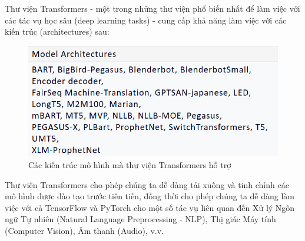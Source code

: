 Thư viện Transformers - một trong những thư viện phổ biến nhất để làm việc với các tác vụ học sâu (deep learning tasks) - cung cấp khả năng làm việc với các kiến trúc (architectures) sau:\\

\begin{figure}[htp]
    \centering
    \includegraphics{images/kdl2.png}
    \caption{Các kiến trúc mô hình mà thư viện Transformers hỗ trợ}
    \end{figure}

Thư viện Transformers cho phép chúng ta dễ dàng tải xuống và tinh chỉnh các mô hình được đào tạo trước tiên tiến, đồng thời cho phép chúng ta dễ dàng làm việc với cả TensorFlow và PyTorch cho một số tác vụ liên quan đến Xử lý Ngôn ngữ Tự nhiên (Natural Language Preprocessing - NLP), Thị giác Máy tính (Computer Vision), Âm thanh (Audio), v.v.
